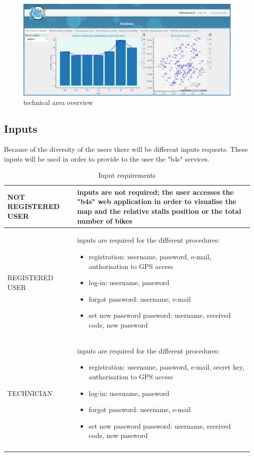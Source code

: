 \documentclass{article}
\begin{document}
\begin{figure}[H]
    \centering
    \includegraphics[width=0.8\linewidth]{image/tech.PNG}
    \caption{technical area overview}
    \label{fig:usageb4s_stat}
\end{figure}

\subsection{Inputs}
Because of the diversity of the users there will be different inputs requests. These inputs will be used in order to provide to the user the "b4s" services.

\begin{longtable}{|l|p{}|}
            \hline
            NOT REGISTERED USER &  inputs are not required; the user accesses the "b4s" web application in order to visualise the map and the relative stalls position or the total number of bikes \\ 
            \hline
            REGISTERED USER  & inputs are required for the different procedures: \begin{itemize}
                \item registration: username, password, e-mail, authorisation to GPS access 
                \item log-in: username, password
                \item forgot password: username, e-mail
                \item set new password password: username, received code, new password
            \end{itemize}
            \\
            \hline
            TECHNICIAN &  inputs are required for the different procedures: \begin{itemize}
                \item registration: username, password, e-mail, secret key, authorisation to GPS access
                \item log-in: username, password
                \item forgot password: username, e-mail
                \item set new password password: username, received code, new password
            \end{itemize}
            \\
            \hline
\caption{Input requirements} \\
\end{longtable}
        
\end{document}
